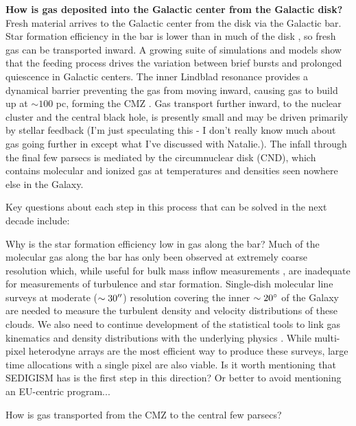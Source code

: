 \documentclass{aastex62}
\def\agnote#1{{\color{red}#1}}
\begin{document}
\textbf{How is gas deposited into the Galactic center from the Galactic disk?}
Fresh material arrives to the Galactic center from the disk via the Galactic bar.
Star formation efficiency in the bar is lower than in much of the disk
\citep[e.g.][]{Rieko2018a}, so fresh gas can be transported inward.
A growing suite of simulations and models
\citep{Krumholz2015a,Sormani2015a,Torrey2016a,Ridley2017a,Krumholz2017a,Sormani2018a,Jeffreson2018a}
show that the feeding process drives the variation between brief bursts and
prolonged quiescence in Galactic centers.  The inner Lindblad resonance provides
a dynamical barrier preventing the gas from moving inward, causing gas to build
up at $\sim100$ pc, forming the CMZ \citep{Krumholz2015a}.  Gas transport further
inward, to the nuclear cluster and the central black hole, is presently small
and may be driven primarily by stellar feedback \agnote{(I'm just speculating
this - I don't really know much about gas going further in except what I've
discussed with Natalie.)}.  The infall through the final few parsecs
is mediated by the circumnuclear disk (CND), which contains molecular and ionized
gas at temperatures and densities seen nowhere else in the Galaxy.


Key questions about each step in this process that can be solved in the next
decade include:

Why is the star formation efficiency low in gas along the bar?
Much of the molecular gas along the bar has only been observed at extremely
coarse resolution which, while useful for bulk mass inflow measurements
\citep[e.g.][]{Sormani2019a}, are inadequate for measurements of turbulence and
star formation.  Single-dish molecular line surveys at moderate
($\sim30\mbox{$^{\prime\prime}$}$) resolution covering the inner $\sim20^{\circ}$ of the Galaxy are
needed to measure the turbulent density and velocity distributions of these
clouds.  We also need to continue development of the statistical tools to link gas kinematics and
density distributions with the underlying physics
\citep{Koch2017a,Burkhart2018a}. While multi-pixel heterodyne arrays are the
most efficient way to produce these surveys, large time allocations with a
single pixel are also viable.  \agnote{Is it worth mentioning that SEDIGISM has
is the first step in this direction?  Or better to avoid mentioning an
EU-centric program...}

How is gas transported from the CMZ to the central few parsecs?
\end{document}
